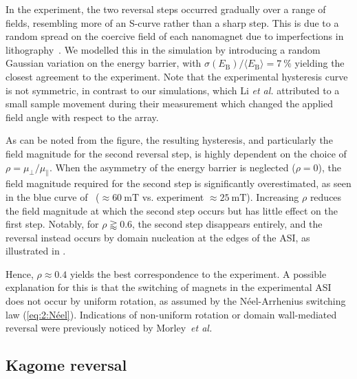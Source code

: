 In the experiment, the two reversal steps occurred gradually over a range of fields, resembling more of an S-curve rather than a sharp step.
This is due to a random spread on the coercive field of each nanomagnet due to imperfections in lithography~\cite{fraleigh2017characterization}. %
We modelled this in the simulation by introducing a random Gaussian variation on the energy barrier, with $\sigma(E_\mathrm{B})/\langle E_\mathrm{B} \rangle=\qty{7}{\percent}$ yielding the closest agreement to the experiment.
Note that the experimental hysteresis curve is not symmetric, in contrast to our simulations, which Li \textit{et al.} attributed to a small sample movement during their measurement which changed the applied field angle with respect to the array. \par
As can be noted from the figure, the resulting hysteresis, and particularly the field magnitude for the second reversal step, is highly dependent on the choice of $\rho=\mu_\perp/\mu_\parallel$.
When the asymmetry of the energy barrier is neglected ($\rho=0$), the field magnitude required for the second step is significantly overestimated, as seen in the blue curve of~ ($\approx\qty{60}{\milli\tesla}$ vs. experiment $\approx\qty{25}{\milli\tesla}$).
Increasing $\rho$ reduces the field magnitude at which the second step occurs but has little effect on the first step.
Notably, for $\rho \gtrapprox 0.6$, the second step disappears entirely, and the reversal instead occurs by domain nucleation at the edges of the ASI, as illustrated in . \par
Hence, $\rho \approx 0.4$ yields the best correspondence to the experiment.
A possible explanation for this is that the switching of magnets in the experimental ASI does not occur by uniform rotation, as assumed by the N\'eel-Arrhenius switching law (\cref{eq:2:Néel}).
Indications of non-uniform rotation or domain wall-mediated reversal were previously noticed by Morley~\textit{et al.}~\cite{VogelFulcherTammannFreezing}

\subsection{Kagome reversal}



